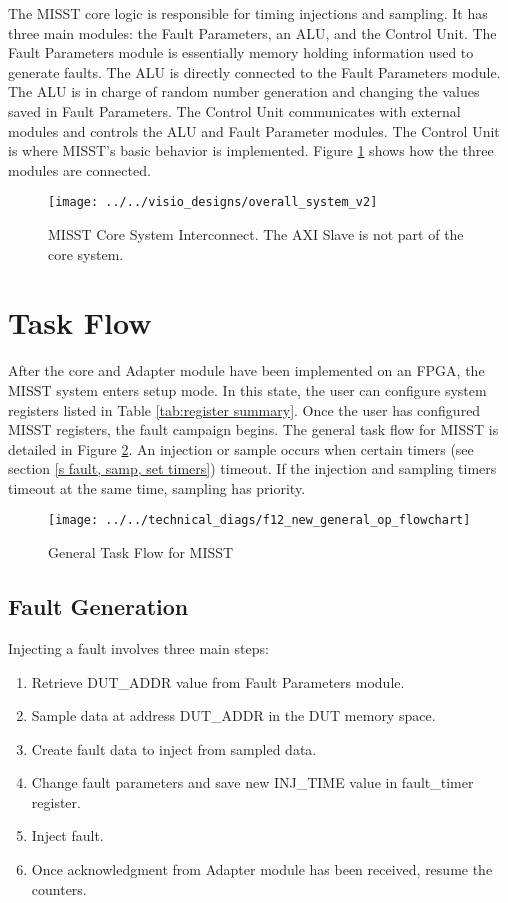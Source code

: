 \documentclass[]{report}
\begin{document}
\clearpage

The MISST core logic is responsible for timing injections and sampling. It has three main modules: the Fault Parameters, an ALU, and the Control Unit. The Fault Parameters module is essentially memory holding information used to generate faults. The ALU is directly connected to the Fault Parameters module. The ALU is in charge of random number generation and changing the values saved in Fault Parameters. The Control Unit communicates with external modules and controls the ALU and Fault Parameter modules. The Control Unit is where MISST's basic behavior is implemented. Figure \ref{fig:core system interconnects} shows how the three modules are connected. 

\begin{figure}[h]
	\centering
	\texttt{[image: ../../visio\_designs/overall\_system\_v2]}
	\caption{MISST Core System Interconnect. The AXI Slave is not part of the core system.}
	\label{fig:core system interconnects}
\end{figure}

\clearpage
\section{Task Flow}
\label{s task flow}

After the core and Adapter module have been implemented on an FPGA, the MISST system enters setup mode. In this state, the user can configure system registers listed in Table \ref{tab:register summary}. Once the user has configured MISST registers, the fault campaign begins. The general task flow for MISST is detailed in Figure \ref{fig:generaflowchart}. An injection or sample occurs when certain timers (see section \ref{s fault, samp, set timers}) timeout. If the injection and sampling timers timeout at the same time, sampling has priority. 

\begin{figure}[h]
	\centering
	\texttt{[image: ../../technical\_diags/f12\_new\_general\_op\_flowchart]}
	\caption{General Task Flow for MISST}
	\label{fig:generaflowchart}
\end{figure}

\clearpage
\subsection{Fault Generation}
\label{ss fault generation}

Injecting a fault involves three main steps:
\begin{enumerate}
	\item Retrieve DUT\_ADDR value from Fault Parameters module.
	\item Sample data at address DUT\_ADDR in the DUT memory space.
	\item Create fault data to inject from sampled data.
	\item Change fault parameters and save new INJ\_TIME value in fault\_timer register.
	\item Inject fault.
	\item Once acknowledgment from Adapter module has been received, resume the counters.
\end{enumerate}
\end{document}

